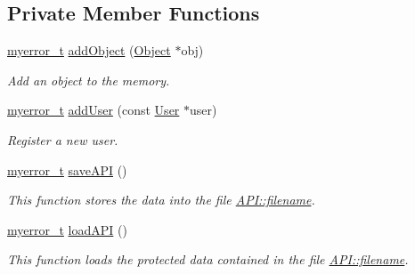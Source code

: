 \subsection*{Private Member Functions}
\begin{DoxyCompactItemize}
\item 
\hyperlink{error_8hpp_acabd2917084445509becf54ab64a4bd0}{myerror\+\_\+t} \hyperlink{classAPI_a08420a3662e1edf2d84275150a26a2d7}{add\+Object} (\hyperlink{classObject}{Object} $\ast$obj)
\begin{DoxyCompactList}\small\item\em Add an object to the memory. \end{DoxyCompactList}\item 
\hyperlink{error_8hpp_acabd2917084445509becf54ab64a4bd0}{myerror\+\_\+t} \hyperlink{classAPI_ac9d164c3d0843702154ad43b7547e758}{add\+User} (const \hyperlink{classUser}{User} $\ast$user)
\begin{DoxyCompactList}\small\item\em Register a new user. \end{DoxyCompactList}\item 
\hyperlink{error_8hpp_acabd2917084445509becf54ab64a4bd0}{myerror\+\_\+t} \hyperlink{classAPI_ae9bf448b00701609e20c2167931b8975}{save\+A\+P\+I} ()
\begin{DoxyCompactList}\small\item\em This function stores the data into the file \hyperlink{classAPI_aa4e36aeea94c8fae7fe0b2a2db58d06b}{A\+P\+I\+::filename}. \end{DoxyCompactList}\item 
\hyperlink{error_8hpp_acabd2917084445509becf54ab64a4bd0}{myerror\+\_\+t} \hyperlink{classAPI_a015f9ca96d3f5ab8af44fe2fe8e0215a}{load\+A\+P\+I} ()
\begin{DoxyCompactList}\small\item\em This function loads the protected data contained in the file \hyperlink{classAPI_aa4e36aeea94c8fae7fe0b2a2db58d06b}{A\+P\+I\+::filename}. \end{DoxyCompactList}\end{DoxyCompactItemize}
